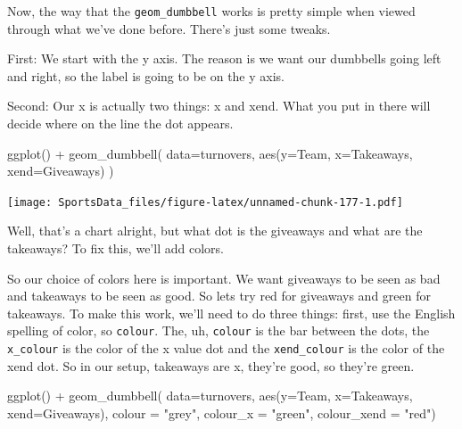 \documentclass[
]{book}
\newenvironment{Shaded}{\begin{snugshade}}{\end{snugshade}}
\newcommand{\AttributeTok}[1]{\textcolor[rgb]{0.77,0.63,0.00}{#1}}
\newcommand{\FunctionTok}[1]{\textcolor[rgb]{0.00,0.00,0.00}{#1}}
\newcommand{\NormalTok}[1]{#1}
\newcommand{\SpecialCharTok}[1]{\textcolor[rgb]{0.00,0.00,0.00}{#1}}
\newcommand{\StringTok}[1]{\textcolor[rgb]{0.31,0.60,0.02}{#1}}
\begin{document}
Now, the way that the \texttt{geom\_dumbbell} works is pretty simple when viewed through what we've done before. There's just some tweaks.

First: We start with the y axis. The reason is we want our dumbbells going left and right, so the label is going to be on the y axis.

Second: Our x is actually two things: x and xend. What you put in there will decide where on the line the dot appears.

\begin{Shaded}
\begin{Highlighting}[]
\FunctionTok{ggplot}\NormalTok{() }\SpecialCharTok{+} 
  \FunctionTok{geom\_dumbbell}\NormalTok{(}
    \AttributeTok{data=}\NormalTok{turnovers, }
    \FunctionTok{aes}\NormalTok{(}\AttributeTok{y=}\NormalTok{Team, }\AttributeTok{x=}\NormalTok{Takeaways, }\AttributeTok{xend=}\NormalTok{Giveaways)}
\NormalTok{  )}
\end{Highlighting}
\end{Shaded}

\texttt{[image: SportsData\_files/figure-latex/unnamed-chunk-177-1.pdf]}

Well, that's a chart alright, but what dot is the giveaways and what are the takeaways? To fix this, we'll add colors.

So our choice of colors here is important. We want giveaways to be seen as bad and takeaways to be seen as good. So lets try red for giveaways and green for takeaways. To make this work, we'll need to do three things: first, use the English spelling of color, so \texttt{colour}. The, uh, \texttt{colour} is the bar between the dots, the \texttt{x\_colour} is the color of the x value dot and the \texttt{xend\_colour} is the color of the xend dot. So in our setup, takeaways are x, they're good, so they're green.

\begin{Shaded}
\begin{Highlighting}[]
\FunctionTok{ggplot}\NormalTok{() }\SpecialCharTok{+} 
  \FunctionTok{geom\_dumbbell}\NormalTok{(}
    \AttributeTok{data=}\NormalTok{turnovers, }
    \FunctionTok{aes}\NormalTok{(}\AttributeTok{y=}\NormalTok{Team, }\AttributeTok{x=}\NormalTok{Takeaways, }\AttributeTok{xend=}\NormalTok{Giveaways),}
    \AttributeTok{colour =} \StringTok{"grey"}\NormalTok{,}
    \AttributeTok{colour\_x =} \StringTok{"green"}\NormalTok{,}
    \AttributeTok{colour\_xend =} \StringTok{"red"}\NormalTok{)}
\end{Highlighting}
\end{Shaded}
\end{document}
